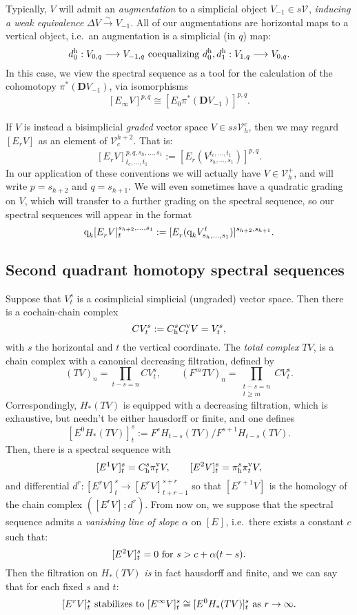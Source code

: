 \documentclass[11pt]{amsart}
\theoremstyle{plain}
\theoremstyle{definition}
\renewcommand{\to}{\longrightarrow}
\newcommand{\calV}{\mathcal{V}}
\theoremstyle{plain}
\newcommand{\vect}[2]{\calV^{#1}_{#2}}
\newcommand{\quadgrad}[1]{\textup{q}_{#1}}
\newcommand{\E}[5]{[E^{#1}_{#2}#3]^{#4}_{#5}}
\newcommand{\uver}{^\textup{v}}
\newcommand{\uhor}{^\textup{h}}
\newcommand{\dhor}{_\textup{h}}
\newcommand{\diag}{\Delta}
\newcommand{\dual}{\mathbf{D}}
\begin{document}
\begin{Conventions and notation}
Typically, $V$ will admit an \emph{augmentation} to a simplicial object $V_{-1}\in s\vect{}{}$, \emph{inducing a weak equivalence} $\diag V\overset{\sim}{\to}V_{-1}$. All of our  augmentations are horizontal maps to a vertical object, i.e.\ an augmentation is a simplicial (in $q$) map:
\[d\uhor_0:V_{0,q}\to V_{-1,q}\textup{ coequalizing }d\uhor_0,d\uhor_1:V_{1,q}\to V_{0,q}.\]
In this case, we view the spectral sequence as a tool for the calculation of the cohomotopy $\pi^*(\dual V_{-1})$, via isomorphisms
\[\E{}{\infty}{V}{p,q}{}\cong \E{}{0}{\pi^*(\dual V_{-1})}{p,q}{}.\]


If $V$ is instead a bisimplicial \emph{graded} vector space $V\in ss\vect{c}{h}$, then we may regard $\E{}{r}{V}{}{}$ as an element of $\vect{h+2}{c}$. That is:
\[\E{}{r}{V}{p,q,s_h,\ldots,s_1}{t_c,\ldots,t_1}:=\E{}{r}{(V^{t_c,\ldots,t_1}_{s_h,\ldots,s_1})}{p,q}{}.\]
In our application of these conventions we will actually have $V\in \vect{+}{h}$, and will write $p=s_{h+2}$ and $q=s_{h+1}$. We will even sometimes have a quadratic grading on $V$, which will transfer to a further grading on the spectral sequence, so our spectral sequences will appear in the format
\[\quadgrad{k}\E{}{r}{V}{s_{h+2},\ldots,s_1}{t}:=\E{}{r}{(\quadgrad{k}V^{t}_{s_h,\ldots,s_1})}{s_{h+2},s_{h+1}}{}.\]

\subsection{Second quadrant homotopy spectral sequences}\label{Second quadrant homotopy spectral sequences}
Suppose that $V^{s}_{t}$ is a cosimplicial simplicial (ungraded) vector space. Then there is a cochain-chain complex 
\[CV^{s}_{t}:=C\dhor^{s}C\uver_{t}V=V^{s}_{t},\]
with $s$ the horizontal and $t$ the vertical coordinate. The \emph{total complex} $TV$, is a chain complex with a canonical decreasing filtration, defined by 
\[(TV)_n=\prod_{t-s=n}CV^{s}_{t},\qquad(F^mTV)_n=\prod_{\substack{t-s=n\\t\geq m}}CV^{s}_{t}.\]
Correspondingly, $H_*( TV)$ is equipped with a decreasing filtration, which is exhaustive, but needn't be either hausdorff or finite, and one defines
\[\E{0}{}{H_*( TV)}{s}{t}:=F^{s}H_{t-s}( TV)/F^{s+1}   H_{t-s}( TV).\]
Then, there is a spectral sequence with
\[\E{1}{}{V}{s}{t}=C\dhor^{s}\pi\uver_{t}V,\qquad\E{2}{}{V}{s}{t}=\pi\dhor^{s}\pi\uver_{t}V,\]
and differential $d^r:\E{r}{}{V}{s}{t}\to \E{r}{}{V}{s+r}{t+r-1}$ so that $\E{r+1}{}{V}{}{}$ is the homology of the chain complex $(\E{r}{}{V}{}{};d^r)$. From now on, we suppose that the spectral sequence admits a \emph{vanishing line of slope $\alpha$} on $\E{}{}{}{}{}$, i.e.\ there exists a constant $c$ such that:
\[\E{2}{}{V}{s}{t}=0\textup{ for }s>c+\alpha(t-s).\]
Then the filtration on $H_*( TV)$ \emph{is} in fact hausdorff and finite, and we can say that for each fixed $s$ and $t$:
\[\E{r}{}{V}{s}{t}\textup{ stabilizes to }\E{\infty}{}{V}{s}{t}\cong \E{0}{}{H_*( TV)}{s}{t}\textup{ as $r\rightarrow\infty$}.\]




\end{Conventions and notation}
\end{document}
